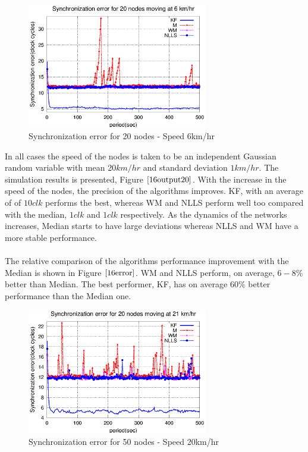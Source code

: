 \documentclass[a4paper,10pt]{report}
\begin{document}
\paragraph*{}
\begin{figure}
\centering
\includegraphics[width=0.7\textwidth]{16output-s6}
\caption{Synchronization error for 20 nodes - Speed 6km/hr} \label{16output6}
\end{figure}
In all cases the speed of the nodes is taken to be an independent Gaussian random variable with mean 20$km/hr$ and standard deviation $1km/hr$. The simulation results is presented, Figure $\ref{16output20}$. With the increase in the speed of the nodes, the precision of the algorithms improves. KF, with an average of of $10 clk$ performs the best, whereas WM and NLLS perform well too compared with the median, $1 clk$ and $1 clk$ respectively. As the dynamics of the networks increases, Median starts to have large deviations whereas NLLS and WM have a more stable performance.
\paragraph*{}
The relative comparison of the algorithms performance improvement with the Median is shown in Figure $\ref{16error}$. WM and NLLS perform, on average, $6-8\%$ better than Median. The best performer, KF, has on average $60\%$ better performance than the Median one.
\begin{figure}
\centering
\includegraphics[width=0.7\textwidth]{16output-s20}
\caption{Synchronization error for 50 nodes - Speed 20km/hr}
\label{16output20}
\end{figure}
\end{document}
